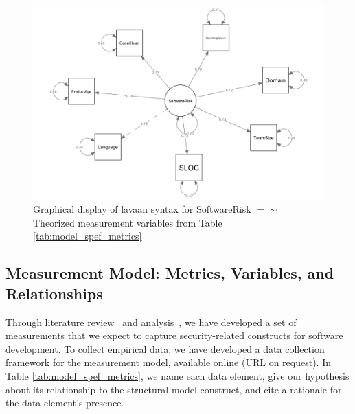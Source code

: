 \begin{figure}
	\centering
		\includegraphics[width=1\textwidth]{syntax_swrisk_asmeasuredby.png}
		\caption{Graphical display of lavaan syntax for SoftwareRisk $=\sim$ Theorized measurement variables from Table  \ref{tab:model_spef_metrics}}
		\label{fig:model_example_syntax_asmeasuredby}	
\end{figure}


\subsection{Measurement Model: Metrics, Variables, and Relationships}
\label{sec:model_measurement}
Through literature review~\cite{morrison2014mapping} and analysis~\cite{morrison2017surveying,morrison2017measuring}, we have developed a set of measurements that we expect to capture security-related constructs for software development. To collect empirical data, we have developed a data collection framework for the measurement model, available online (URL on request). In Table \ref{tab:model_spef_metrics}, we name each data element, give our hypothesis about its relationship to the structural model construct, and cite a rationale for the data element's presence. 
		
